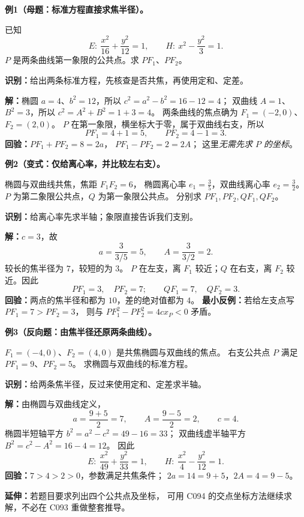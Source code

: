 \clearpage
\begin{examplebox}
\textbf{例1（母题：标准方程直接求焦半径）。}

已知
\[
E:\ \frac{x^2}{16}+\frac{y^2}{12}=1,\qquad
H:\ x^2-\frac{y^2}{3}=1.
\]
$P$ 是两条曲线第一象限的公共点。求 $PF_1$、$PF_2$。

\begin{center}

\end{center}

\textbf{识别：}给出两条标准方程，先核查是否共焦，再使用定和、定差。

\textbf{解：}椭圆 $a=4$、$b^2=12$，所以 $c^2=a^2-b^2=16-12=4$；
双曲线 $A=1$、$B^2=3$，所以 $c^2=A^2+B^2=1+3=4$。
两条曲线的焦点确为 $F_1=(-2,0)$、$F_2=(2,0)$。
$P$ 在第一象限，横坐标大于零，属于双曲线右支，所以
\[
\boxed{PF_1=4+1=5,\qquad PF_2=4-1=3}.
\]
\textbf{回验：}$PF_1+PF_2=8=2a$，
$PF_1-PF_2=2=2A$；
这里\emph{无需先求 $P$ 的坐标}。
\end{examplebox}

\clearpage
\begin{examplebox}
\textbf{例2（变式：仅给离心率，并比较左右支）。}

椭圆与双曲线共焦，焦距 $F_1F_2=6$，
椭圆离心率 $e_1=\frac35$，双曲线离心率 $e_2=\frac32$。
$P$ 为第二象限公共点，$Q$ 为第一象限公共点。
分别求 $PF_1,PF_2,QF_1,QF_2$。

\textbf{识别：}给离心率先求半轴；象限直接告诉我们支别。

\textbf{解：}$c=3$，故
\[
a=\frac{3}{3/5}=5,\qquad A=\frac{3}{3/2}=2.
\]
较长的焦半径为 $7$，较短的为 $3$。
$P$ 在左支，离 $F_1$ 较近；$Q$ 在右支，离 $F_2$ 较近。因此
\[
\boxed{PF_1=3,\quad PF_2=7;\qquad QF_1=7,\quad QF_2=3}.
\]
\textbf{回验：}两点的焦半径和都为 $10$，差的绝对值都为 $4$。
\textbf{最小反例：}若给左支点写 $PF_1=7>PF_2=3$，
则与 $PF_1^2-PF_2^2=4cx_P<0$ 矛盾。
\end{examplebox}

\clearpage
\begin{examplebox}
\textbf{例3（反向题：由焦半径还原两条曲线）。}

$F_1=(-4,0)$、$F_2=(4,0)$ 是共焦椭圆与双曲线的焦点。
右支公共点 $P$ 满足 $PF_1=9$、$PF_2=5$。
求椭圆与双曲线的标准方程。

\textbf{识别：}给两条焦半径，反过来使用定和、定差求半轴。

\textbf{解：}由椭圆与双曲线定义，
\[
a=\frac{9+5}{2}=7,\qquad A=\frac{9-5}{2}=2,\qquad c=4.
\]
椭圆半短轴平方 $b^2=a^2-c^2=49-16=33$；
双曲线虚半轴平方 $B^2=c^2-A^2=16-4=12$。
因此
\[
\boxed{E:\ \frac{x^2}{49}+\frac{y^2}{33}=1},\qquad
\boxed{H:\ \frac{x^2}{4}-\frac{y^2}{12}=1}.
\]
\textbf{回验：}$7>4>2>0$，参数满足共焦条件；
$2a=14=9+5$，$2A=4=9-5$。

\textbf{延伸：}若题目要求列出四个公共点及坐标，
可用 C094 的交点坐标方法继续求解，不必在 C093 重做整套推导。
\end{examplebox}
